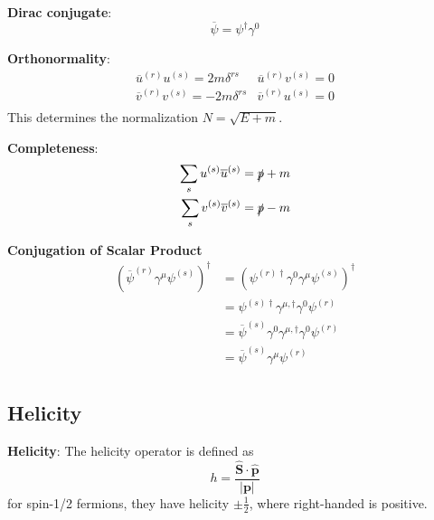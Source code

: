 \documentclass[12pt]{article}
\theoremstyle{definition}
\begin{document}
\textbf{Dirac conjugate}:
\begin{equation*}
    \overline{\psi} = \psi^\dagger \gamma^0 
\end{equation*}

\textbf{Orthonormality}:
\begin{equation*}
    \begin{array}{ll}
        \overline{u}^{(r)} u^{(s)} = 2m \delta^{rs} & \overline{u}^{(r)} v^{(s)} = 0 \\
        \overline{v}^{(r)} v^{(s)} = -2m \delta^{rs} & \overline{v}^{(r)} u^{(s)} = 0 \\
    \end{array}
\end{equation*}
This determines the normalization $N = \sqrt{E + m}$. 

\textbf{Completeness}:
\begin{equation*}
\begin{split}
    \sum_s u^{(s)} \overline{u}^{(s)} &= \slashed{p} + m \\
    \sum_s v^{(s)} \overline{v}^{(s)} &= \slashed{p} - m \\
\end{split}
\end{equation*}

\textbf{Conjugation of Scalar Product}
\begin{equation*}
\begin{split}
    \left(\overline{\psi}^{(r)} \gamma^\mu \psi^{(s)}\right)^\dagger
        &= \left( \psi^{(r)\dagger} \gamma^0 \gamma^\mu \psi^{(s)} \right)^\dagger \\
        &= \psi^{(s)\dagger} \gamma^{\mu,\dagger} \gamma^0 \psi^{(r)} \\
        &= \overline{\psi}^{(s)} \gamma^0 \gamma^{\mu,\dagger} \gamma^0 \psi^{(r)} \\
        &= \overline{\psi}^{(s)} \gamma^\mu \psi^{(r)} \\
\end{split}
\end{equation*}

\subsection{Helicity}
\textbf{Helicity}: The helicity operator is defined as
\begin{equation*}
    h = \frac{\hat{\bm{S}} \cdot \hat{\bm{p}}}{|\bm{p}|}
\end{equation*}
for spin-1/2 fermions, they have helicity $\pm \frac{1}{2}$, where right-handed is positive.
\end{document}
